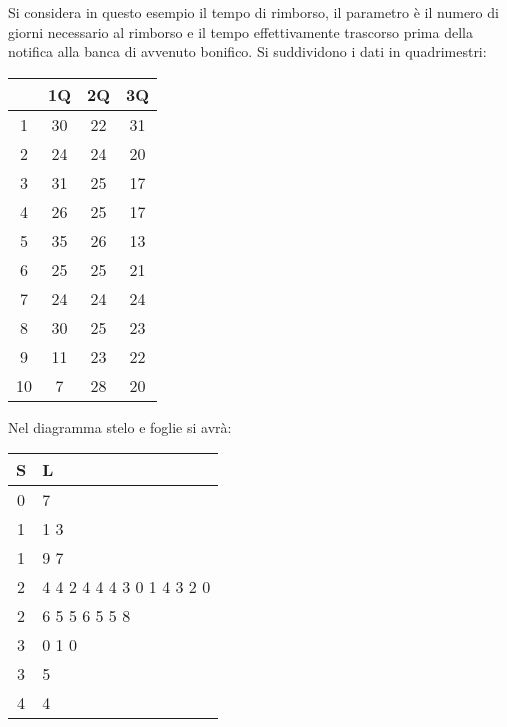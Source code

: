 Si considera in questo esempio il tempo di rimborso, il parametro è il numero 
di giorni necessario al rimborso e il tempo effettivamente trascorso prima 
della notifica alla banca di avvenuto bonifico.
Si suddividono i dati in quadrimestri:
\begin{table}[h]
    \centering
    \begin{tabular}{c | c | c | c}
      & 1Q & 2Q & 3Q \\ \hline
    1 & 30 & 22 & 31 \\ \hline
    2 & 24 & 24 & 20 \\ \hline
    3 & 31 & 25 & 17 \\ \hline
    4 & 26 & 25 & 17 \\ \hline
    5 & 35 & 26 & 13 \\ \hline
    6 & 25 & 25 & 21 \\ \hline
    7 & 24 & 24 & 24 \\ \hline
    8 & 30 & 25 & 23 \\ \hline
    9 & 11 & 23 & 22 \\ \hline
    10 & 7  & 28 & 20 
    \end{tabular}
\end{table}

Nel diagramma stelo e foglie si avrà:
\begin{table}[h]
    \centering
    \begin{tabular}{c|l}
        S & L \\ \hline
        0 & 7 \\ \hline
        1 & 1 3 \\ \hline
        1 & 9 7 \\ \hline
        2 & 4 4 2 4 4 4 3 0 1 4 3 2 0 \\ \hline
        2 & 6 5 5 6 5 5 8 \\ \hline
        3 & 0 1 0 \\ \hline
        3 & 5 \\ \hline
        4 & 4
    \end{tabular}
\end{table}

